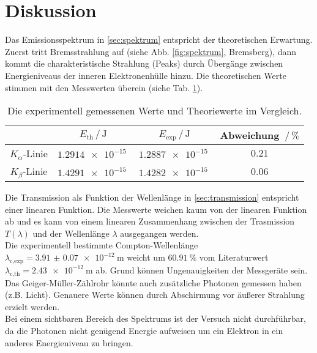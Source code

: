 \section{Diskussion}
\label{sec:Diskussion}
Das Emissionsspektrum in \autoref{sec:spektrum} entspricht der theoretischen Erwartung.
Zuerst tritt Bremsstrahlung auf (siehe Abb. \ref{fig:spektrum}, Bremsberg), dann kommt die charakteristische Strahlung (Peaks) durch Übergänge zwischen Energieniveaus der inneren Elektronenhülle hinzu.
Die theoretischen Werte stimmen mit den Messwerten überein (siehe Tab. \ref{tab:spektrum_vgl}).
\begin{table}
    \centering
    \begin{tabular}{c|ccc}
    \toprule
        & $E_\text{th} \,/\, \si{\joule}$ & $E_\text{exp} \,/\, \si{\joule}$ & Abweichung $\,/\, \%$\\
    \midrule
    $K_\alpha$-Linie & $\SI{1.2914e-15}{}$ & $\SI{1.2887e-15}{}$ & $0.21$ \\
    $K_\beta$-Linie & $\SI{1.4291e-15}{}$ & $\SI{1.4282e-15}{}$ & $0.06$ \\
    \bottomrule
    \end{tabular}
    \caption{Die experimentell gemessenen Werte und Theoriewerte \cite{klinie} im  Vergleich.}
    \label{tab:spektrum_vgl}
\end{table}
\FloatBarrier
Die Transmission als Funktion der Wellenlänge in \autoref{sec:transmission} entspricht einer linearen Funktion.
Die Messwerte weichen kaum von der linearen Funktion ab und es kann von einem linearen Zusammenhang zwischen der Trasmission $T(\lambda)$ und der Wellenlänge $\lambda$ ausgegangen werden.
\\
Die experimentell bestimmte Compton-Wellenlänge $\lambda_\text{c,exp} = \SI{3.91(7)e-12}{\metre}$ weicht um $\SI{60.91}{\percent}$ vom Literaturwert $\lambda_\text{c,th} = \SI{2.43e-12}{\metre}$ \cite{compton} ab.
Grund können Ungenauigkeiten der Messgeräte sein.
Das Geiger-Müller-Zählrohr könnte auch zusätzliche Photonen gemessen haben (z.B. Licht).
Genauere Werte können durch Abschirmung vor äußerer Strahlung erzielt werden.
\\
Bei einem sichtbaren Bereich des Spektrums ist der Versuch nicht durchführbar, da die Photonen nicht genügend Energie aufweisen um ein Elektron in ein anderes Energieniveau zu bringen.